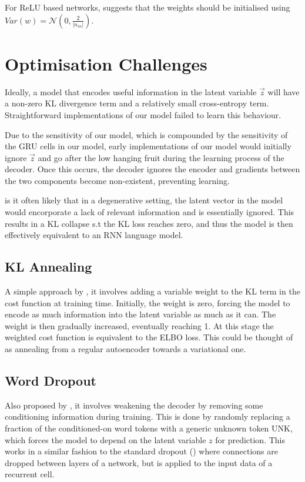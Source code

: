 \documentclass[12pt,twoside]{report}
\begin{document}
For ReLU based networks, 
suggests that the weights should be initialised using $Var(w)=\mathcal{N}(0,\frac{2}{|n_{in}|})$. 

\section{Optimisation Challenges}

Ideally, a model that encodes useful information in the latent variable $\overrightarrow{z}$ will have a non-zero KL divergence term and a relatively small cross-entropy term. Straightforward implementations of our model failed to learn this behaviour.

Due to the sensitivity of our model, which is compounded by the sensitivity of the GRU cells in our model, early implementations of our model would initially ignore $\overrightarrow{z}$ and go after the low hanging fruit during the learning process of the decoder. Once this occurs, the decoder ignores the encoder and gradients between the two components become non-existent, preventing learning.

is it often likely that in a degenerative setting, the latent vector in the model would encorporate a lack of relevant information and is essentially ignored. This results in a KL collapse s.t the KL loss reaches zero, and thus the model is then effectively equivalent to an RNN language model.

\subsection{KL Annealing}

A simple approach by \cite{bowman_generating_2015}, it involves adding a variable weight to the KL term in the cost function at training time. Initially, the weight is zero, forcing the model to encode as much information into the latent variable as much as it can. The weight is then gradually increased, eventually reaching 1. At this stage the weighted cost function is equivalent to the ELBO loss. This could be thought of as annealing from a regular autoencoder towards a variational one.

\subsection{Word Dropout}
Also proposed by \cite{bowman_generating_2015}, it involves weakening the decoder by removing some conditioning information during training. This is done by randomly replacing a fraction of the conditioned-on word tokens with a generic unknown token UNK, which forces the model to depend on the latent variable $z$ for prediction. This works in a similar fashion to the standard dropout (\cite{srivastava_dropout:_2014}) where connections are dropped between layers of a network, but is applied to the input data of a recurrent cell.
\end{document}
